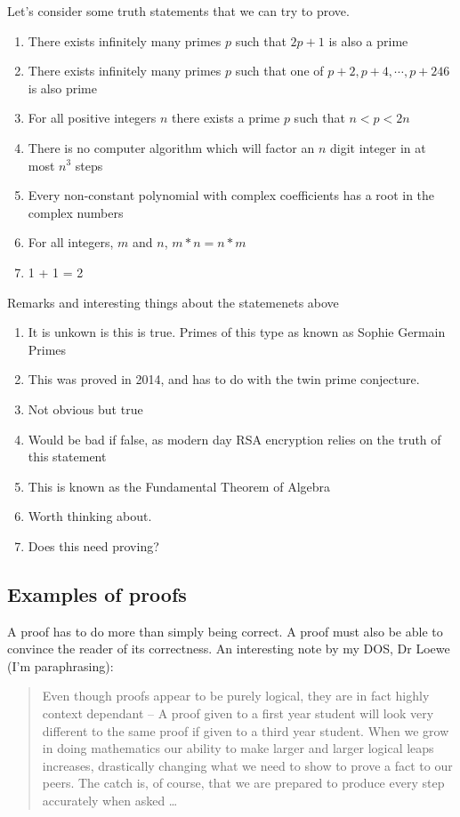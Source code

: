 \documentclass{article}
\begin{document}
\begin{eg}
    Let's consider some truth statements that we can try to prove.
    \begin{enumerate}
        \item There exists infinitely many primes $p$ such that $2p + 1$ is also a prime
        \item There exists infinitely many primes $p$ such that one of $p+2, p+4, \cdots, p+246$ is also prime
        \item For all positive integers $n$ there exists a prime $p$ such that $n < p < 2n$
        \item There is no computer algorithm which will factor an $n$ digit integer in at most $n^3$ steps
        \item Every non-constant polynomial with complex coefficients has a root in the complex numbers
        \item For all integers, $m$ and $n$, $m * n = n * m$
        \item 1 + 1 = 2
    \end{enumerate}

    Remarks and interesting things about the statemenets above
    \begin{enumerate}
        \item It is unkown is this is true. Primes of this type as known as Sophie Germain Primes
        \item This was proved in 2014, and has to do with the twin prime conjecture.
        \item Not obvious but true
        \item Would be bad if false, as modern day RSA encryption relies on the truth of this statement
        \item This is known as the Fundamental Theorem of Algebra
        \item Worth thinking about. 
        \item Does this need proving?
    \end{enumerate}
\end{eg}
\subsection{Examples of proofs}

A proof has to do more than simply being correct. A proof must also be able to convince the reader of its correctness. An interesting note by my DOS, Dr Loewe (I'm paraphrasing): 
\begin{quote}
    Even though proofs appear to be purely logical, they are in fact highly context dependant -- A proof given to a first year student will look very different to the same proof if given to a third year student. When we grow in doing mathematics our ability to make larger and larger logical leaps increases, drastically changing what we need to show to prove a fact to our peers. The catch is, of course, that we are prepared to produce every step accurately when asked \ldots
\end{quote}
\end{document}
